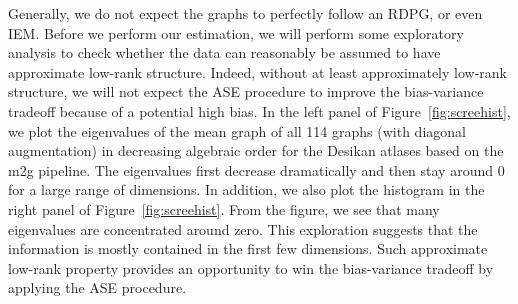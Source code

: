 \documentclass[a4paper]{article}
\begin{document}
Generally, we do not expect the graphs to perfectly follow an RDPG, or even IEM. Before we perform our estimation, we will perform some exploratory analysis to check whether the data can reasonably be assumed to have approximate low-rank structure. Indeed, without at least approximately low-rank structure, we will not expect the ASE procedure to improve the bias-variance tradeoff because of a potential high bias. In the left panel of Figure~\ref{fig:screehist}, we plot the eigenvalues of the mean graph of all 114 graphs (with diagonal augmentation) in decreasing algebraic order for the Desikan atlases based on the m2g pipeline. The eigenvalues first decrease dramatically and then stay around 0 for a large range of dimensions. In addition, we also plot the histogram in the right panel of Figure~\ref{fig:screehist}. From the figure, we see that many eigenvalues are concentrated around zero. 
This exploration suggests that the information is mostly contained in the first few dimensions. Such approximate low-rank property provides an opportunity to win the bias-variance tradeoff by applying the ASE procedure.
\end{document}

